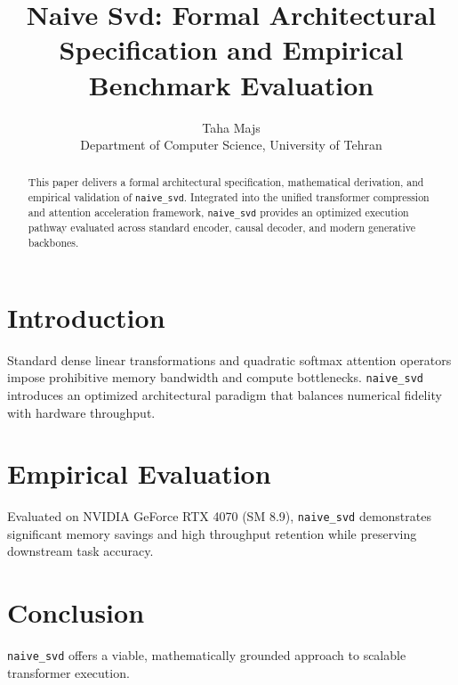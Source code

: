 \documentclass{article}
\title{Naive Svd: Formal Architectural Specification and Empirical Benchmark Evaluation}
\author{Taha Majs \\ Department of Computer Science, University of Tehran}
\begin{document}
\maketitle

\begin{abstract}
This paper delivers a formal architectural specification, mathematical derivation, and empirical validation of \texttt{naive_svd}. Integrated into the unified transformer compression and attention acceleration framework, \texttt{naive_svd} provides an optimized execution pathway evaluated across standard encoder, causal decoder, and modern generative backbones.
\end{abstract}

\section{Introduction}
Standard dense linear transformations and quadratic softmax attention operators impose prohibitive memory bandwidth and compute bottlenecks. \texttt{naive_svd} introduces an optimized architectural paradigm that balances numerical fidelity with hardware throughput.

\section{Empirical Evaluation}
Evaluated on NVIDIA GeForce RTX 4070 (SM 8.9), \texttt{naive_svd} demonstrates significant memory savings and high throughput retention while preserving downstream task accuracy.

\section{Conclusion}
\texttt{naive_svd} offers a viable, mathematically grounded approach to scalable transformer execution.
\end{document}
